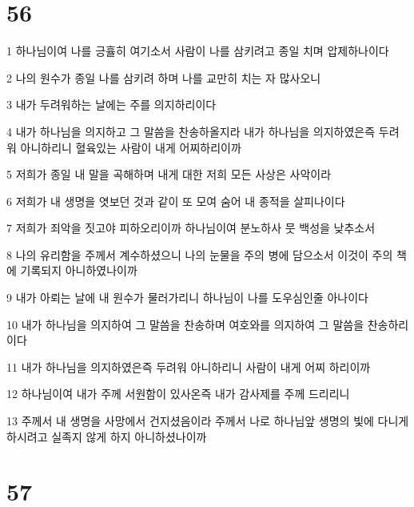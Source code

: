 \chapter{56}

\par 1 하나님이여 나를 긍휼히 여기소서 사람이 나를 삼키려고 종일 치며 압제하나이다
\par 2 나의 원수가 종일 나를 삼키려 하며 나를 교만히 치는 자 많사오니
\par 3 내가 두려워하는 날에는 주를 의지하리이다
\par 4 내가 하나님을 의지하고 그 말씀을 찬송하올지라 내가 하나님을 의지하였은즉 두려워 아니하리니 혈육있는 사람이 내게 어찌하리이까
\par 5 저희가 종일 내 말을 곡해하며 내게 대한 저희 모든 사상은 사악이라
\par 6 저희가 내 생명을 엿보던 것과 같이 또 모여 숨어 내 종적을 살피나이다
\par 7 저희가 죄악을 짓고야 피하오리이까 하나님이여 분노하사 뭇 백성을 낮추소서
\par 8 나의 유리함을 주께서 계수하셨으니 나의 눈물을 주의 병에 담으소서 이것이 주의 책에 기록되지 아니하였나이까
\par 9 내가 아뢰는 날에 내 원수가 물러가리니 하나님이 나를 도우심인줄 아나이다
\par 10 내가 하나님을 의지하여 그 말씀을 찬송하며 여호와를 의지하여 그 말씀을 찬송하리이다
\par 11 내가 하나님을 의지하였은즉 두려워 아니하리니 사람이 내게 어찌 하리이까
\par 12 하나님이여 내가 주께 서원함이 있사온즉 내가 감사제를 주께 드리리니
\par 13 주께서 내 생명을 사망에서 건지셨음이라 주께서 나로 하나님앞 생명의 빛에 다니게 하시려고 실족지 않게 하지 아니하셨나이까

\chapter{57}

